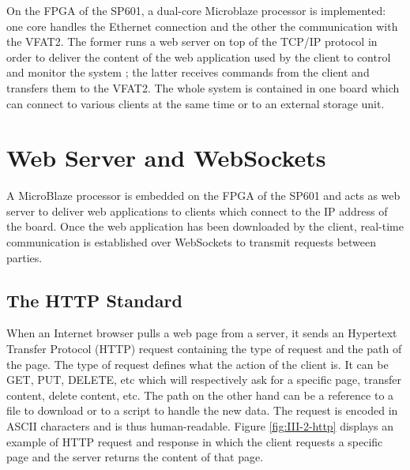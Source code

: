     On the FPGA of the SP601, a dual-core Microblaze processor is implemented: one core handles the Ethernet connection and the other the communication with the VFAT2. The former runs a web server on top of the TCP/IP protocol in order to deliver the content of the web application used by the client to control and monitor the system ; the latter receives commands from the client and transfers them to the VFAT2. The whole system is contained in one board which can connect to various clients at the same time or to an external storage unit.

  \section{Web Server and WebSockets}

    A MicroBlaze processor is embedded on the FPGA of the SP601 and acts as web server to deliver web applications to clients which connect to the IP address of the board. Once the web application has been downloaded by the client, real-time communication is established over WebSockets to transmit requests between parties.

    \subsection{The HTTP Standard}

      When an Internet browser pulls a web page from a server, it sends an Hypertext Transfer Protocol (HTTP) request containing the type of request and the path of the page. The type of request defines what the action of the client is. It can be GET, PUT, DELETE, etc which will respectively ask for a specific page, transfer content, delete content, etc. The path on the other hand can be a reference to a file to download or to a script to handle the new data. The request is encoded in ASCII characters and is thus human-readable. Figure \ref{fig:III-2-http} displays an example of HTTP request and response in which the client requests a specific page and the server returns the content of that page. \\


